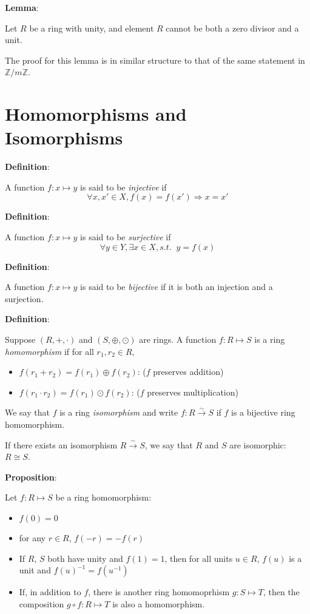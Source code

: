\documentclass{article}
\begin{document}
\begin{multicols*}{2}
\textbf{Lemma}:

Let $R$ be a ring with unity, and element $R$ cannot be both a zero divisor and a unit.

The proof for this lemma is in similar structure to that of the same statement in $\mathbb{Z}/m\mathbb{Z}$.

\section{Homomorphisms and Isomorphisms}

\textbf{Definition}:

A function $f: x \mapsto y$ is said to be \textit{injective} if \[\forall x,x' \in X,f(x) = f(x') \Rightarrow x = x'\]

\textbf{Definition}:

A function $f: x \mapsto y$ is said to be \textit{surjective} if\[\forall y\in Y,\exists x\in X, s.t. \;\; y = f(x)\]

\textbf{Definition}:

A function $f: x \mapsto y$ is said to be \textit{bijective} if it is both an injection and a surjection.

\textbf{Definition}:

Suppose $(R, +, \cdot)$ and $(S, \oplus, \odot)$ are rings. A function $f: R \mapsto S$ is a ring \textit{homomorphism} if for all $r_1,r_2 \in R$, 

\begin{itemize}
    \item $f(r_1 + r_2) = f(r_1) \oplus f(r_2)$: ($f$ preserves addition)
    \item $f(r_1 \cdot r_2) = f(r_1) \odot f(r_2)$: ($f$ preserves multiplication)
\end{itemize}

We say that $f$ is a ring \textit{isomorphism} and write $f : R \xrightarrow{\sim} S$ if $f$ is a bijective ring homomorphism.

If there exists an isomorphism $R \xrightarrow{\sim} S$, we say that $R$ and $S$ are isomorphic: $R \cong S$.

\textbf{Proposition}:

Let $f : R \mapsto S$ be a ring homomorphism:

\begin{itemize}
    \item $f(0) = 0$
    \item for any $r \in R$, $f(-r) = -f(r)$
    \item If $R$, $S$ both have unity and $f(1) = 1$, then for all units $u \in R$, $f(u)$ is a unit and $f(u)^{-1} = f(u^{-1})$
    \item If, in addition to $f$, there is another ring homomoprhism $g: S \mapsto T$, then the composition $g \circ f : R \mapsto T$ is also a homomorphism.
\end{itemize}


\end{multicols*}
\end{document}

